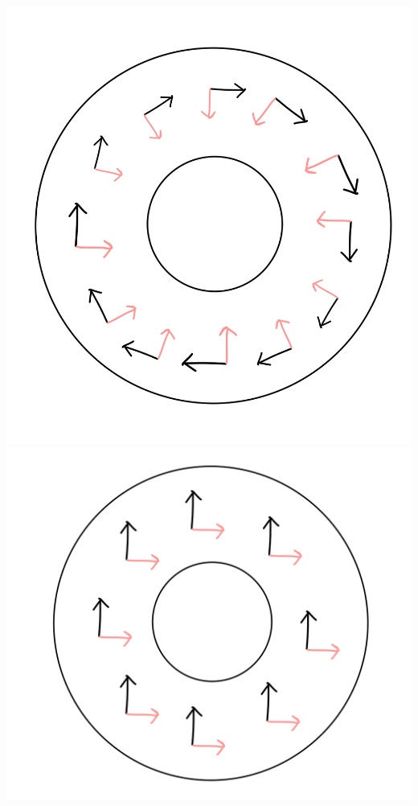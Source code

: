 \begin{exercise}
\begin{center}
            \includegraphics[scale=0.1]{images/Exercises/+1framing.jpeg}
            \includegraphics[scale=0.1]{images/Exercises/0framing.jpeg}

		\end{center}

  
\end{exercise}


